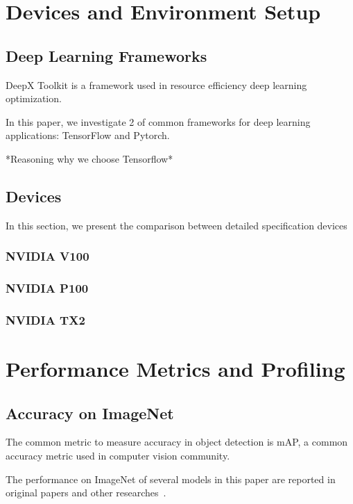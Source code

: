 \documentclass[conference]{IEEEtran}
\begin{document}
\section{Devices and Environment Setup}

\subsection{Deep Learning Frameworks}
DeepX Toolkit is a framework used in resource efficiency deep learning optimization.

In this paper, we investigate 2 of common frameworks for deep learning applications: TensorFlow and Pytorch.

*Reasoning why we choose Tensorflow*

\subsection{Devices}
In this section, we present the comparison between detailed specification devices

\subsubsection{NVIDIA V100}

\subsubsection{NVIDIA P100}

\subsubsection{NVIDIA TX2}

\section{Performance Metrics and Profiling}

\subsection{Accuracy on ImageNet}
The common metric to measure accuracy in object detection is mAP, a common accuracy metric used in computer vision community.

The performance on ImageNet of several models in this paper are reported in original papers and other researches~\cite{huang2017speed}.
\end{document}
